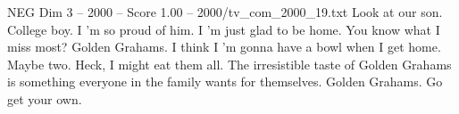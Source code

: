\begin{textsample}{NEG Dim 3 – 2000 – Score 1.00 – 2000/tv\_com\_2000\_19.txt}  \label{ex:f3_neg_013}
Look at our son.
College boy.
I 'm so proud of him.
I 'm just glad to be home.
You know what I miss most?
Golden Grahams.
I think I 'm gonna have a bowl when I get home.
Maybe two.
Heck, I might eat them all.
The irresistible taste of Golden Grahams is something everyone in the family wants for themselves.
Golden Grahams.
Go get your own.

\end{textsample}
